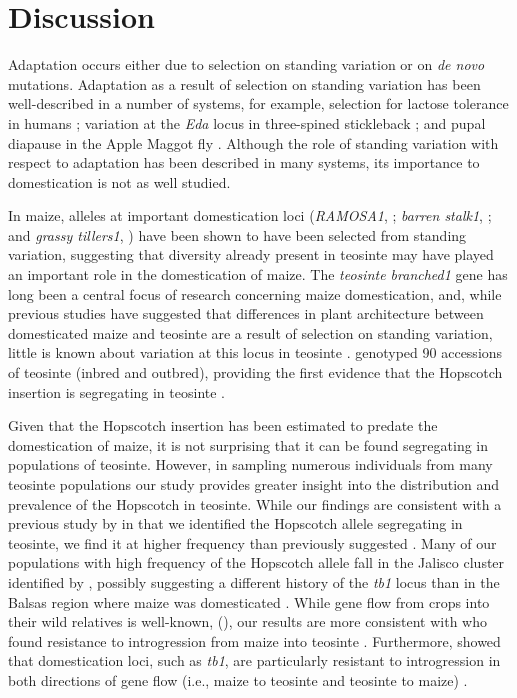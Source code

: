 \documentclass[12pt]{article}
\begin{document}
\section*{Discussion}

Adaptation occurs either due to selection on standing variation or on \emph{de novo} mutations. Adaptation as a result of selection on standing variation has been well-described in a number of systems, for example, selection for lactose tolerance in humans \citep{Plantinga2012, Tishkoff2007}; variation at the \emph{Eda} locus in three-spined stickleback \citep{Kitano2008, Colosimo2005}; and pupal diapause in the Apple Maggot fly \citep{Feder2003}. Although the role of standing variation with respect to adaptation has been described in many systems, its importance to domestication is not as well studied. 

In maize, alleles at important domestication loci (\emph{RAMOSA1}, \citep{SigmonVollbrecht2010}; \emph{barren stalk1}, \citep{Gallavotti2004}; and \emph{grassy tillers1}, \citep{Whipple2011}) have been shown to have been selected from standing variation, suggesting that diversity already present in teosinte may have played an important role in the domestication of maize. The \emph{teosinte branched1} gene has long been a central focus of research concerning maize domestication, and, while previous studies have suggested that differences in plant architecture between domesticated maize and teosinte are a result of selection on standing variation, little is known about variation at this locus in teosinte \citep{Clark2006, Studer2011}. \citet{Studer2011} genotyped 90 accessions of teosinte (inbred and outbred), providing the first evidence that the Hopscotch insertion is segregating in teosinte \citep{Studer2011}. 

Given that the Hopscotch insertion has been estimated to predate the domestication of maize, it is not surprising that it can be found segregating in populations of teosinte. However, in sampling numerous individuals from many teosinte populations our study provides greater insight into the distribution and prevalence of the Hopscotch in teosinte. While our findings are consistent with a previous study by \citet{Studer2011} in that we identified the Hopscotch allele segregating in teosinte, we find it at higher frequency than previously suggested \citep{Studer2011}. Many of our populations with high frequency of the Hopscotch allele fall in the Jalisco cluster identified by \citet{Fukunaga2005}, possibly suggesting a different history of the \emph{tb1} locus than in the Balsas region where maize was domesticated \citep{Matsuoka2002}. While gene flow from crops into their wild relatives is well-known, (\citep{Ellstrand1999, Zhang2009, Thurber2010, Baack2008, Hubner2012, Wilkes1977, VanHeerwaarden2011, Barrett1983}), our results are more consistent with \citet{Hufford2013} who found resistance to introgression from maize into teosinte \citep{Hufford2013}. Furthermore, \citet{Hufford2013} showed that domestication loci, such as \emph{tb1}, are particularly resistant to introgression in both directions of gene flow (i.e., maize to teosinte and teosinte to maize) \citep{Hufford2013}. 
\end{document}
